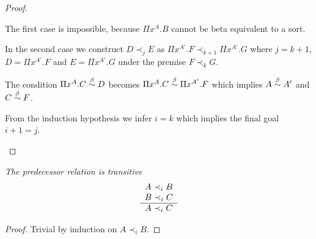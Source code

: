 \begin{lemma}
\begin{proof}
\begin{enumerate}
        The first case is impossible, because $\Pi x^A. B$ cannot be beta
        equivalent to a sort.

        In the second case we construct $D \prec_j E$ as
        $\Pi x^{A'}. F \prec_{k+1} \Pi x^{A'}. G$ where $j = k + 1$,
        $D = \Pi x^{A'}. F$ and $E = \Pi x^{A'}. G$
        under the premise $F \prec_k G$.

        The condition $\Pi x^A. C \stackrel{\beta}{\sim} D$ becomes $\Pi x^A.C \stackrel{\beta}{\sim} \Pi
        x^{A'}. F$ which implies $A \stackrel{\beta}{\sim} A'$ and $C \stackrel{\beta}{\sim} F$.

        From the induction hypothesis we infer $i = k$ which implies the final
        goal $i + 1 = j$.
        \end{enumerate}
    \end{proof}
\end{lemma}



\begin{lemma}
    \label{PrecedenceTransitive}
    \emph{The predecessor relation is transitive}
    $$
    \begin{array}{c} 
        A \prec_i B
        \\
        B \prec_i C
     \\ \hline 
        A \prec_i C
    \end{array}
    $$
    \begin{proof}
        Trivial by induction on $A \prec_i B$.
    \end{proof}
\end{lemma}







